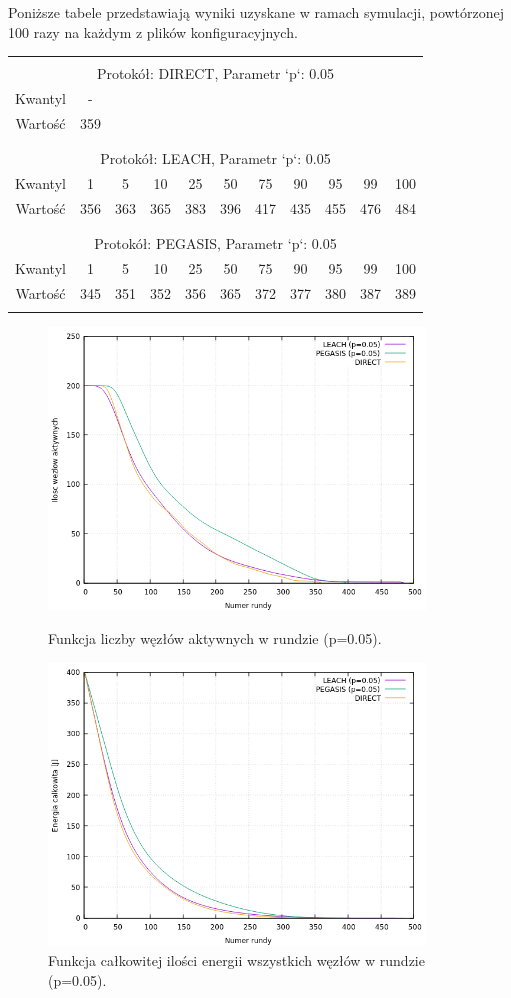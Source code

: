 \documentclass[a4paper,12pt,twoside,openany]{report}
\begin{document}
Poniższe tabele przedstawiają wyniki uzyskane w ramach symulacji, powtórzonej 100 razy na każdym z plików konfiguracyjnych.

\begin{longtable}{*{11}{c}}
\toprule \\*
\multicolumn{11}{c}{Protokół: DIRECT, Parametr `p`: 0.05} \\*
Kwantyl	& -	\\*
Wartość	& 359	\\*
\midrule \\*
\\*
\multicolumn{11}{c}{Protokół: LEACH, Parametr `p`: 0.05} \\*
Kwantyl	& 1	& 5	& 10	& 25	& 50	& 75	& 90	& 95	& 99	& 100	\\*
Wartość	& 356	& 363	& 365	& 383	& 396	& 417	& 435	& 455	& 476	& 484	\\*
\midrule \\*
\\*
\multicolumn{11}{c}{Protokół: PEGASIS, Parametr `p`: 0.05} \\*
Kwantyl	& 1	& 5	& 10	& 25	& 50	& 75	& 90	& 95	& 99	& 100	\\*
Wartość	& 345	& 351	& 352	& 356	& 365	& 372	& 377	& 380	& 387	& 389	\\*	
\bottomrule \\*
\end{longtable}

\begin{figure}[H]
 \centering
 \includegraphics[width=10cm]{images/gnuplot/test_4/nodes_in_round_p005.png}
 \caption{Funkcja liczby węzłów aktywnych w rundzie (p=0.05).}
 \includegraphics[width=10cm]{images/gnuplot/test_4/energy_in_round_p005.png}
 \caption{Funkcja całkowitej ilości energii wszystkich węzłów w rundzie (p=0.05).}
\end{figure}
\end{document}
